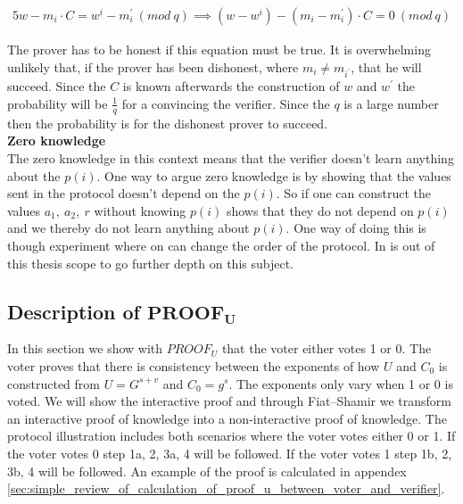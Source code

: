 \begin{alignat*}{5}
w-m_i \cdot C = w^i-m_i^{'}\ (mod\ q) \implies (w-w^i)-(m_i - m_i^{'})  \cdot  C = 0 \ (mod\ q) 
\end{alignat*}


\noindent
The prover has to be honest if this equation must be true. It is overwhelming unlikely that, if the prover has been dishonest, where $m_i \neq m_{i^{'}}$, that he will succeed. Since the $C$ is known afterwards the construction of $w$ and $w^{'}$ the probability will be \begin{math} \frac{1}{q}\end{math} for a convincing the verifier. Since the $q$ is a large number then the probability is for the dishonest prover to succeed.\\


\noindent
\textbf{Zero knowledge}\\
The zero knowledge in this context means that the verifier doesn't learn anything about the $p(i)$. One way to argue zero knowledge is by showing that the values sent in the protocol doesn't depend on the $p(i)$. So if one can construct the values $a_1, \ a_2, \ r$  without knowing  $p(i)$  shows that they do not depend on $p(i)$ and we thereby do not learn anything about $p(i)$. One way of doing this is though experiment where on can change the order of the protocol. In is out of this thesis scope to go further depth on this subject.\\

 

\subsection{Description of $ \mathbf{PROOF_U} $} \label{sec:proof_u}
In this section we show with $PROOF_U$ that the voter either votes  1 or 0. The voter proves that there is consistency between the exponents of how \begin{math}U\end{math} and \begin{math}C_0\end{math} is constructed from \begin{math}U=G^{s+v}\end{math} and \begin{math}C_0 = g^s\end{math}. The exponents only vary when 1 or 0 is voted. We will show the interactive proof and through Fiat–Shamir  we transform an interactive proof of knowledge into a non-interactive proof of knowledge. The protocol illustration includes both scenarios where the voter votes either 0 or 1. If the voter votes 0 step 1a, 2, 3a, 4 will be followed. If the voter votes 1 step 1b, 2, 3b, 4 will be followed. An example of the proof is calculated in appendex \ref{sec:simple_review_of_calculation_of_proof_u_between_voter_and_verifier}.\\

